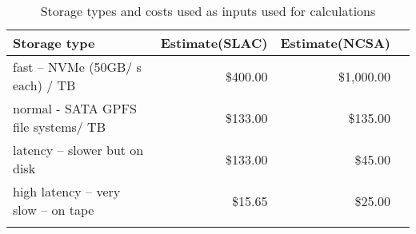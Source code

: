 \tiny \begin{longtable} { |p{}  |r  |r  |r |} 
\caption{Storage types and costs used as inputs used for calculations \label{tab:Storage}}\\ 
\hline 
\textbf{Storage type }&\textbf{Estimate(SLAC)}&\textbf{Estimate(NCSA)} \\ \hline
{fast -- NVMe (50GB/ s each) / TB  }&{\$400.00}&{\$1,000.00} \\ \hline
{normal - SATA GPFS file systems/ TB  }&{\$133.00}&{\$135.00} \\ \hline
{latency -- slower but on disk }&{\$133.00}&{\$45.00} \\ \hline
{high latency -- very slow -- on tape }&{\$15.65}&{\$25.00} \\ \hline
{}&{}&{} \\ \hline
\end{longtable} \normalsize
